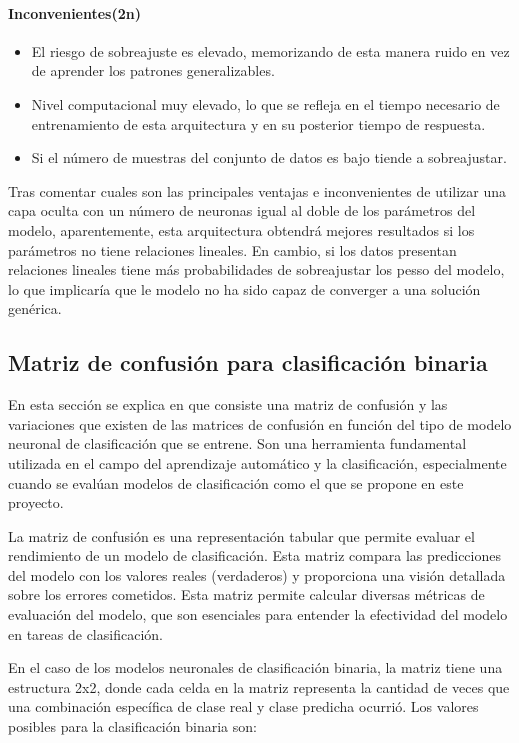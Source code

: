 \paragraph{Inconvenientes(2n)}
\begin{itemize}
	\item El riesgo de sobreajuste es elevado, memorizando de esta manera ruido en vez de aprender los patrones generalizables.
	\item Nivel computacional muy elevado, lo que se refleja en el tiempo necesario de entrenamiento de esta arquitectura y en su posterior tiempo de respuesta.
	\item Si el número de muestras del conjunto de datos es bajo tiende a sobreajustar.
\end{itemize}

Tras comentar cuales son las principales ventajas e inconvenientes de utilizar una capa oculta con un número de neuronas igual al doble de los parámetros del modelo, aparentemente, esta arquitectura obtendrá mejores resultados si los parámetros no tiene relaciones lineales. En cambio, si los datos presentan relaciones lineales tiene más probabilidades de sobreajustar los pesso del modelo, lo que implicaría que le modelo no ha sido capaz de converger a una solución genérica.


\subsection{Matriz de confusión para clasificación binaria} \label{sec.matriz-consfusion}
En esta sección se explica en que consiste una matriz de confusión y las variaciones que existen de las matrices de confusión en función del tipo de modelo neuronal de clasificación que se entrene. Son una herramienta fundamental utilizada en el campo del aprendizaje automático y la clasificación, especialmente cuando se evalúan modelos de clasificación como el que se propone en este proyecto.

La matriz de confusión es una representación tabular que permite evaluar el rendimiento de un modelo de clasificación. Esta matriz compara las predicciones del modelo con los valores reales (verdaderos) y proporciona una visión detallada sobre los errores cometidos. Esta matriz permite calcular diversas métricas de evaluación del modelo, que son esenciales para entender la efectividad del modelo en tareas de clasificación.

En el caso de los modelos neuronales de clasificación binaria, la matriz tiene una estructura 2x2, donde cada celda en la matriz representa la cantidad de veces que una combinación específica de clase real y clase predicha ocurrió. Los valores posibles para la clasificación binaria son: 

